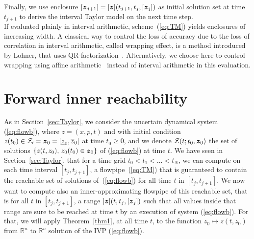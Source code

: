 \documentclass{sig-alternate-05-2015}
\newcommand\ForAuthors[1]%
 {\par\smallskip                     %
  \begin{center}%
   \fbox%
   {\parbox{0.9\linewidth}%
    {\raggedright\sc--- #1}%
   }%
  \end{center}%
  \par\smallskip                     %
 }
\def\R{{\mathbb R}}
\begin{document}
Finally, we use enclosure $[{\z}_{j+1}]=[\z](t_{j+1},t_j,[{\z}_j])$ as initial solution set at time $t_{j+1}$ to derive the interval Taylor model on the next time step. \\

If evaluated plainly in interval arithmetic, scheme~(\ref{eq:TM}) yields enclosures of increasing width. A classical way to control the loss 
of accuracy due to the loss of correlation in interval arithmetic, called wrapping effect, is a method introduced by Lohner, that uses QR-factorization~\cite{Nedialkov99}.
Alternatively, we choose here to control wrapping using affine arithmetic~\cite{com-sto-93-aa} instead of interval arithmetic in this evaluation. 

\section{Forward inner reachability}
\label{sec:inner_reachability}

As in Section~\ref{sec:Taylor}, we consider the uncertain dynamical system (\ref{eq:flowb}), where $z=(x,p,t)$ and with initial condition 
$z(t_0) \in {\cal Z_0} = \z_0=[\underline{z}_0,\overline{z}_0]$ at time $t_0 \geq 0$, and we denote ${\cal Z}(t;t_0, \z_0)$
 the set of solutions $\{ z(t,z_0), \, z_0(t_0) \in \z_0 \}$ of  (\ref{eq:flowb}) at time $t$. 
We have seen in  Section~\ref{sec:Taylor}, that for a  time grid $t_0 < t_1 < \ldots < t_N$, we can compute on each time interval  $[t_j,t_{j+1}]$,
a flowpipe~(\ref{eq:TM}) 
that is guaranteed to contain the reachable set of solutions of~(\ref{eq:flowb}) for all time $t$ in $[t_j,t_{j+1}]$. 
We now want to compute also an inner-approximating flowpipe of this reachable set, that is for all $t$ in $[t_j,t_{j+1}]$, 
a range $]\z[(t,t_j,[\z_j])$ such that all values inside that range are sure to be reached at time $t$ by an execution of system (\ref{eq:flowb}).
For that, we will apply Theorem~\ref{thm1}, at all time $t$, to the function $z_0 \mapsto z(t,z_0)$ from $\R^n$ to $\R^n$
 solution of the IVP (\ref{eq:flowb}). 
\end{document}
